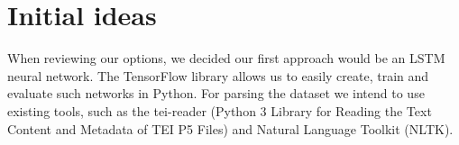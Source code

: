 \documentclass[11pt,a4paper]{article}
\begin{document}
\section{Initial ideas}

When reviewing our options, we decided our first approach would be an LSTM neural network. The TensorFlow library allows us to easily create, train and evaluate such networks in Python. For parsing the dataset we intend to use existing tools, such as the tei-reader (Python 3 Library for Reading the Text Content and Metadata of TEI P5 Files) and Natural Language Toolkit (NLTK).



\end{document}
